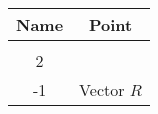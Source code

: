 \begin{tabular}[12pt]{ |c| c|}
    \hline
    \textbf{Name} & \textbf{Point}\\ 
    \hline
	\myvec{2\\2\\-1} & Vector $R$ \\
    \hline
    \end{tabular}